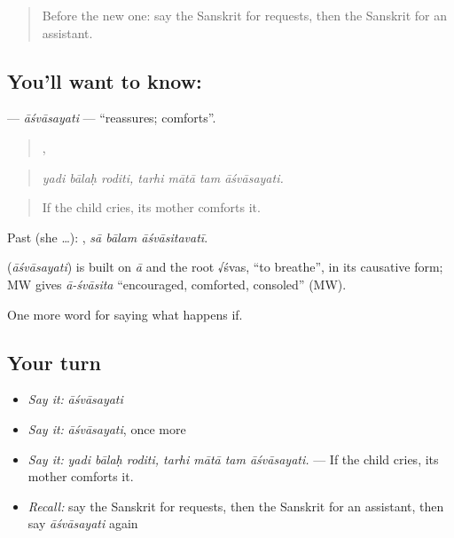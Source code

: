 \label{lesson:SA-C392-asvasayati}



\begin{quote}
Before the new one: say the Sanskrit for requests, then the Sanskrit for an assistant.
\end{quote}

\subsection*{You'll want to know: }
\textbf{} — \emph{āśvāsayati} — \textquotedblleft{}reassures; comforts\textquotedblright{}.

\begin{quote}
  ,    
\end{quote}

\begin{quote}
\emph{yadi bālaḥ roditi, tarhi mātā tam āśvāsayati.}
\end{quote}

\begin{quote}
If the child cries, its mother comforts it.
\end{quote}

Past (she …):   , \emph{sā bālam āśvāsitavatī}.

\begin{cousinweb}
\textbf{} (\emph{āśvāsayati}) is built on \emph{ā} and the root √śvas, \textquotedblleft{}to breathe\textquotedblright{}, in its causative form; MW gives \emph{ā-śvāsita} \textquotedblleft{}encouraged, comforted, consoled\textquotedblright{} (MW).
\end{cousinweb}

\begin{grammarlens}[title={What you've built}]
One more word for saying what happens if.
\end{grammarlens}

\subsection*{Your turn}
\begin{itemize}
\raggedright
  \item \emph{Say it:} \emph{āśvāsayati}
  \item \emph{Say it:} \emph{āśvāsayati}, once more
  \item \emph{Say it:} \emph{yadi bālaḥ roditi, tarhi mātā tam āśvāsayati.} — If the child cries, its mother comforts it.
  \item \emph{Recall:} say the Sanskrit for requests, then the Sanskrit for an assistant, then say \emph{āśvāsayati} again
\end{itemize}

